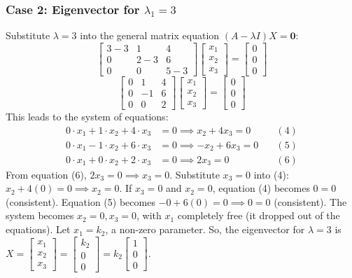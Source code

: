 \documentclass{article}
\begin{document}
\subsubsection*{Case 2: Eigenvector for $\lambda_1 = 3$} %
Substitute $\lambda = 3$ into the general matrix equation $(A - \lambda I)X = \mathbf{0}$:
\[ \begin{bmatrix} 3 - 3 & 1 & 4 \\ 0 & 2 - 3 & 6 \\ 0 & 0 & 5 - 3 \end{bmatrix} \begin{bmatrix} x_1 \\ x_2 \\ x_3 \end{bmatrix} = \begin{bmatrix} 0 \\ 0 \\ 0 \end{bmatrix} \]
\[ \begin{bmatrix} 0 & 1 & 4 \\ 0 & -1 & 6 \\ 0 & 0 & 2 \end{bmatrix} \begin{bmatrix} x_1 \\ x_2 \\ x_3 \end{bmatrix} = \begin{bmatrix} 0 \\ 0 \\ 0 \end{bmatrix} \]
This leads to the system of equations:
\begin{align*} 0 \cdot x_1 + 1 \cdot x_2 + 4 \cdot x_3 &= 0 \implies x_2 + 4x_3 = 0 \quad &(4) \\ 0 \cdot x_1 - 1 \cdot x_2 + 6 \cdot x_3 &= 0 \implies -x_2 + 6x_3 = 0 \quad &(5) \\ 0 \cdot x_1 + 0 \cdot x_2 + 2 \cdot x_3 &= 0 \implies 2x_3 = 0 \quad &(6) \end{align*}
From equation (6), $2x_3 = 0 \implies x_3 = 0$.
Substitute $x_3 = 0$ into (4): $x_2 + 4(0) = 0 \implies x_2 = 0$.
If $x_3=0$ and $x_2=0$, equation (4) becomes $0=0$ (consistent). Equation (5) becomes $-0 + 6(0) = 0 \implies 0=0$ (consistent).
The system becomes $x_2 = 0, x_3 = 0$, with $x_1$ completely free (it dropped out of the equations).
Let $x_1 = k_2$, a non-zero parameter.
So, the eigenvector for $\lambda = 3$ is $X = \begin{bmatrix} x_1 \\ x_2 \\ x_3 \end{bmatrix} = \begin{bmatrix} k_2 \\ 0 \\ 0 \end{bmatrix} = k_2 \begin{bmatrix} 1 \\ 0 \\ 0 \end{bmatrix}$.
\end{document}
